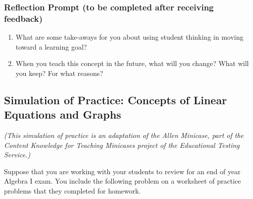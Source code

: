 \documentclass[11pt]{article}
\theoremstyle{definition}
\begin{document}
\subsubsection*{Reflection Prompt (to be completed after receiving feedback)}
\begin{enumerate}
\item What are some take-aways for you about using student thinking in moving toward a learning goal?
\item When you teach this concept in the future, what will you change?  What will you keep?  For what reasons? 
\end{enumerate}


\newpage \subsection{Simulation of Practice: Concepts of Linear Equations and Graphs}


%

{\it (This simulation of practice is an adaptation of the Allen Minicase, part of the Content Knowledge for Teaching Minicases project of the Educational Testing Service.)}

Suppose that you are working with your students to review for an end of year Algebra I exam. You include the following problem on a worksheet of practice problems that they completed for homework.
\end{document}

